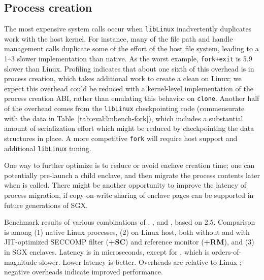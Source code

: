\subsection{Process creation}

The most expensive system calls occur when {\tt libLinux} inadvertently duplicates work
with the host kernel.  
For instance, many of the file path and handle management calls duplicate some of the effort of the host file system,
leading to a 1--3\x{} slower implementation than native.
As the worst example,
{\tt fork+exit} is 5.9\x{} slower than Linux.
Profiling indicates that about one sixth of this overhead is in process creation, which 
takes additional work to create a clean \picoproc{} on Linux; we expect this overhead could be reduced
with a kernel-level implementation of the process creation ABI, rather than emulating this behavior on {\tt clone}.
Another half of the overhead comes from the
{\tt libLinux} checkpointing code (commensurate with the data in Table~\ref{tab:eval:lmbench-fork}), which 
includes a substantial amount of serialization effort which might be reduced by checkpointing the data structures in place.
A more competitive {\tt fork} will require host support and additional {\tt libLinux} tuning.


One way to further optimize  is to reduce or avoid enclave creation time; one can potentially pre-launch a child enclave, and then migrate the process contents later when  is called.
There might be another opportunity to improve the latency of process migration,
if copy-on-write sharing of enclave pages can be supported in future generations of SGX.





\begin{table}[t!b!]

\caption{Benchmark results of various combinations of , , and , based on \lmbench{} 2.5. Comparison is among (1) native Linux processes, (2) \graphene{} \picoprocs{} on Linux host, both without and with JIT-optimized SECCOMP filter ({\bf +SC}) and reference monitor ({\bf +RM}), and (3) \graphene{} in SGX enclaves.
Latency is in microseconds, except for \graphenesgx{}, which is orders-of-magnitude slower. Lower latency is better.
Overheads are relative to Linux \linuxversion{}; negative overheads indicate improved performance.} 
\label{tab:eval:lmbench-fork}
\end{table}







